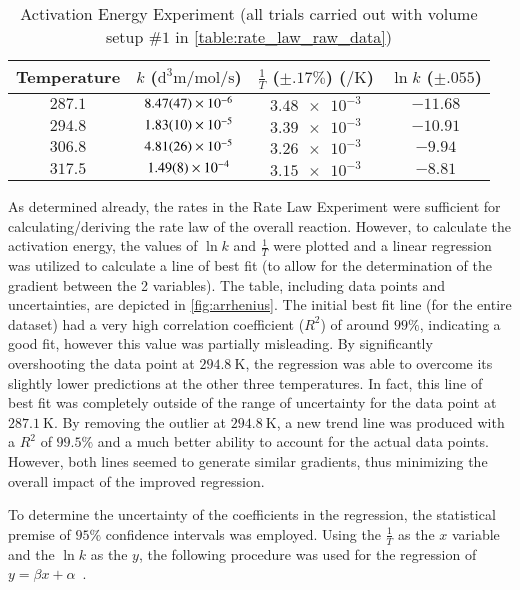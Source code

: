 \begin{table}[htb!]
\centering
	\begin{tabular}{|c|c|c|c|} 
		 \hline
		 Temperature & $k$ ($\si{\cubic\deci\metre\per\mol\per\second}$) & $\frac{1}{T}$ ($\pm .17\%$) ($\si{\per\kelvin}$) & $\ln{k}$ ($\pm .055$) \\
		  \hline
		  $287.1$ & $\num{8.47\pm.47e-6}$ & $\num{3.48e-3}$ & $-11.68$ \\
		  \hline
		  $294.8$ & $\num{1.83\pm.10e-5}$ & $\num{3.39e-3}$ & $-10.91$\\
		  \hline
		  $306.8$ & $\num{4.81\pm.26e-5}$ & $\num{3.26e-3}$ & $-9.94$\\
		  \hline
		  $317.5$ & $\num{1.49\pm.08e-4}$ & $\num{3.15e-3}$ & $-8.81$\\
		  \hline
		\end{tabular}
	\caption{Activation Energy Experiment (all trials carried out with volume setup $\#1$ in \cref{table:rate_law_raw_data})}
	\label{table:activation_energy_processed_data}
\end{table}

As determined already, the rates in the Rate Law Experiment were sufficient for calculating/deriving the rate law of the overall reaction. However, to calculate the activation energy, the values of $\ln{k}$ and $\frac{1}{T}$ were plotted and a linear regression was utilized to calculate a line of best fit (to allow for the determination of the gradient between the 2 variables). The table, including data points and uncertainties, are depicted in \cref{fig:arrhenius}. The initial best fit line (for the entire dataset) had a very high correlation coefficient ($R^2$) of around $99\%$, indicating a good fit, however this value was partially misleading. By significantly overshooting the data point at $\SI{294.8}{\kelvin}$, the regression was able to overcome its slightly lower predictions at the other three temperatures. In fact, this line of best fit was completely outside of the range of uncertainty for the data point at $\SI{287.1}{\kelvin}$. By removing the outlier at $\SI{294.8}{\kelvin}$, a new trend line was produced with a $R^2$ of $99.5\%$ and a much better ability to account for the actual data points. However, both lines seemed to generate similar gradients, thus minimizing the overall impact of the improved regression.

To determine the uncertainty of the coefficients in the regression, the statistical premise of $95\%$ confidence intervals was employed. Using the $\frac{1}{T}$ as the $x$ variable and the $\ln{k}$ as the $y$, the following procedure was used for the regression of $y = \beta x + \alpha$~\parencite{regression_stat_book}.

